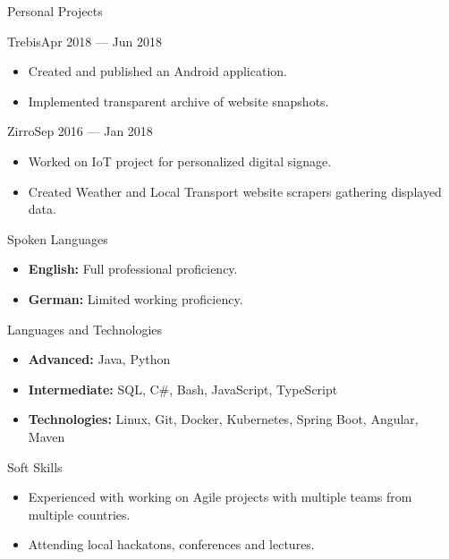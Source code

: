 \documentclass[]{style}
\begin{document}
	\begin{cvsection}{Personal Projects}
	    \begin{cvsubsection}{Trebis}{}{Apr 2018 — Jun 2018}
			\begin{itemize}
				\item Created and published an Android application.
				\item Implemented transparent archive of website snapshots.
			\end{itemize}
		\end{cvsubsection}
		
		\begin{cvsubsection}{Zirro}{}{Sep 2016 — Jan 2018}
			\begin{itemize}
			    \item Worked on IoT project for personalized digital signage.
				\item Created Weather and Local Transport website scrapers gathering displayed data.
			\end{itemize}
		\end{cvsubsection}
	\end{cvsection}
	
	\begin{cvsection}{Spoken Languages}
		\begin{cvsubsection}{}{}{}	
			\begin{itemize}
                \item \textbf{English:} Full professional proficiency.
                \item \textbf{German:} Limited working proficiency.
			\end{itemize}
		\end{cvsubsection}
	\end{cvsection}
	
	\begin{cvsection}{Languages and Technologies}
		\begin{cvsubsection}{}{}{}
			\begin{itemize}
				\item \textbf{Advanced:} Java, Python \item \textbf{Intermediate:} SQL, C\#, Bash, JavaScript, TypeScript
				\item \textbf{Technologies:} Linux, Git, Docker, Kubernetes, Spring Boot, Angular, Maven
			\end{itemize}
		\end{cvsubsection}
	\end{cvsection}
	
	\begin{cvsection}{Soft Skills}
		\begin{cvsubsection}{}{}{}	
			\begin{itemize}
                \item Experienced with working on Agile projects with multiple teams from multiple countries.
                \item Attending local hackatons, conferences and lectures.
			\end{itemize}
		\end{cvsubsection}
	\end{cvsection}
	
	
\end{document}
